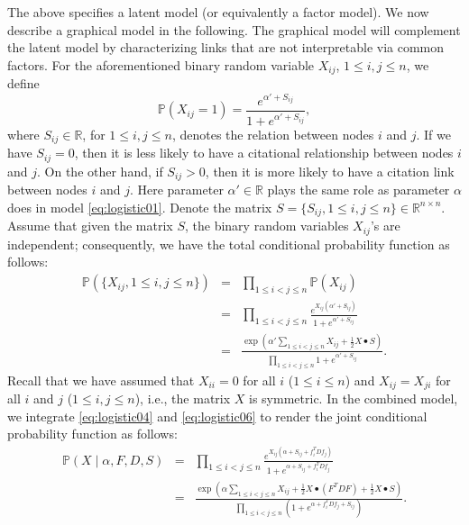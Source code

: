 \documentclass[AMS,STIX1COL]{WileyNJD-v2}
\begin{document}
The above specifies a latent model (or equivalently a factor model).
We now describe a graphical model in the following.
The graphical model will complement the latent model by characterizing links that are not interpretable via common factors.
For the aforementioned binary random variable $X_{ij}$, $1\le i,j \le n$, we define
\begin{equation}
\label{eq:logistic05}
\mathbb{P}(X_{ij}=1) = \frac{e^{\alpha' + S_{ij} }}{1 + e^{\alpha' + S_{ij} }},
\end{equation}
where $S_{ij} \in \mathbb{R}$, for $1\le i,j \le n$, denotes the relation between nodes $i$ and $j$.
If we have $S_{ij}=0$, then it is less likely to have a citational relationship between nodes $i$ and $j$.
On the other hand, if $S_{ij}>0$, then it is more likely to have a citation link between nodes $i$ and $j$.
Here parameter $\alpha' \in \mathbb{R}$ plays the same role as parameter $\alpha$ does in model \eqref{eq:logistic01}.
Denote the matrix $S = \{S_{ij}, 1\le i,j \le n \} \in \mathbb{R}^{n \times n}$.
Assume that given the matrix $S$, the binary random variables
$X_{ij}$'s are independent;
consequently, we have the total conditional probability function as follows:
\begin{eqnarray}
\mathbb{P}(\{X_{ij}, 1\le i,j \le n\})
&=& \prod_{1\le i<j \le n} \mathbb{P}(X_{ij}) \nonumber \\
&=& \prod_{1\le i<j \le n}  \frac{e^{X_{ij}(\alpha' + S_{ij}) }}{1 + e^{\alpha' + S_{ij} }} \nonumber \\
&=& \frac{\exp(\alpha' \sum_{1\le i< j\le n}X_{ij} +\frac{1}{2} X \bullet S)}{\prod_{1\le i<j \le n}  1 + e^{\alpha' + S_{ij} }}.
\label{eq:logistic06}
\end{eqnarray}
Recall that we have assumed that $X_{ii}=0$ for all $i$ ($1\le i \le n$) and $X_{ij} = X_{ji}$ for all $i$ and $j$ ($1\le i,j \le n$), i.e., the matrix $X$ is symmetric.
In the combined model, we integrate \eqref{eq:logistic04} and
\eqref{eq:logistic06} to render the joint conditional probability function as follows:
\begin{eqnarray}
\label{eq:logistic07}
\mathbb{P}(X \mid \alpha,  F, D, S)
&=&  \prod_{1\le i<j \le n}
\frac{e^{X_{ij}(\alpha + S_{ij} + f_i^T D f_j) }}{1 + e^{\alpha + S_{ij}+ f_i^T D f_j}} \nonumber \\
&=& \frac{\exp\left(\alpha \sum_{1\le i< j\le n}X_{ij} +\frac{1}{2} X \bullet (F^T D F) +\frac{1}{2} X \bullet S\right)}{\prod_{1\le i<j \le n}  \left(1 + e^{\alpha + f_i^T D f_j +S_{ij}}\right) }.
\end{eqnarray}
\end{document}
